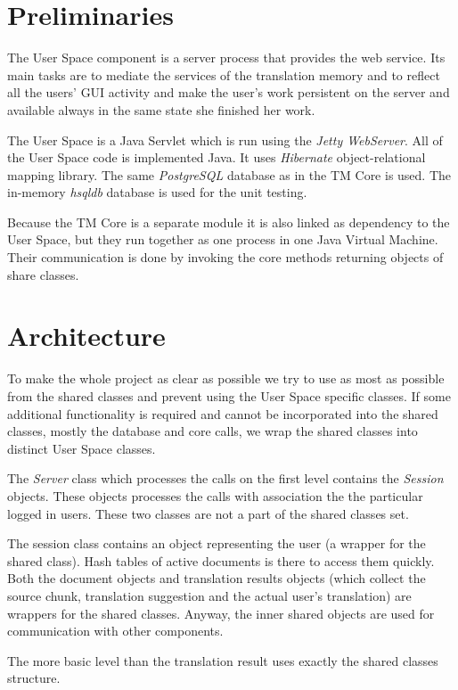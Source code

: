 \section{Preliminaries}

The User Space component is a server process that provides the web service. Its main tasks are to mediate the services of the translation memory and to reflect all the users' GUI activity and make the user's work persistent on the server and available always in the same state she finished her work.

The User Space is a Java Servlet which is run using the \emph{Jetty WebServer}. All of the User Space code is implemented Java. It uses \emph{Hibernate} object-relational mapping library. The same \emph{PostgreSQL} database as in the TM Core is used. The in-memory \emph{hsqldb} database is used for the unit testing.

Because the TM Core is a separate module it is also linked as dependency to the User Space, but they run together as one process in one Java Virtual Machine. Their communication is done by invoking the core methods returning objects of share classes.

\section{Architecture}

To make the whole project as clear as possible we try to use as most as possible from the shared classes and prevent using the User Space specific classes. If some additional functionality is required and cannot be incorporated into the shared classes, mostly the database and core calls, we wrap the shared classes into distinct User Space classes.

The \emph{Server} class which processes the calls on the first level contains the {\it Session} objects. These objects processes the calls with association the the particular logged in users. These two classes are not a part of the shared classes set.

The session class contains an object representing the user (a wrapper for the shared class). Hash tables of active documents is there to access  them quickly. Both the document objects and translation results objects (which collect the source chunk, translation suggestion and the actual user's translation) are wrappers for the shared classes. Anyway, the inner shared objects are used for communication with other components.

The more basic level than the translation result uses exactly the shared classes structure.

